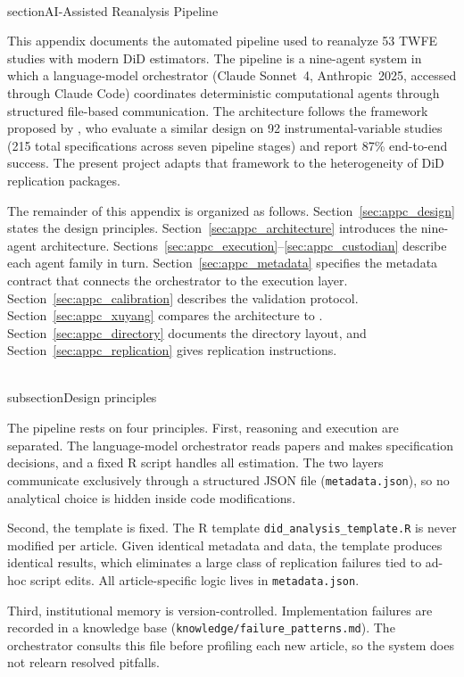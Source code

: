 \\section{AI-Assisted Reanalysis Pipeline}
\label{AppendixC}

This appendix documents the automated pipeline used to reanalyze 53 TWFE studies with modern DiD estimators. The pipeline is a nine-agent system in which a language-model orchestrator (Claude Sonnet~4, Anthropic~2025, accessed through Claude Code) coordinates deterministic computational agents through structured file-based communication. The architecture follows the framework proposed by \textcite{xu2026scaling}, who evaluate a similar design on 92 instrumental-variable studies (215 total specifications across seven pipeline stages) and report 87\% end-to-end success. The present project adapts that framework to the heterogeneity of DiD replication packages.

The remainder of this appendix is organized as follows. Section~\ref{sec:appc_design} states the design principles. Section~\ref{sec:appc_architecture} introduces the nine-agent architecture. Sections~\ref{sec:appc_execution}--\ref{sec:appc_custodian} describe each agent family in turn. Section~\ref{sec:appc_metadata} specifies the metadata contract that connects the orchestrator to the execution layer. Section~\ref{sec:appc_calibration} describes the validation protocol. Section~\ref{sec:appc_xuyang} compares the architecture to \textcite{xu2026scaling}. Section~\ref{sec:appc_directory} documents the directory layout, and Section~\ref{sec:appc_replication} gives replication instructions.


\\subsection{Design principles}
\label{sec:appc_design}

The pipeline rests on four principles. First, reasoning and execution are separated. The language-model orchestrator reads papers and makes specification decisions, and a fixed R script handles all estimation. The two layers communicate exclusively through a structured JSON file (\texttt{metadata.json}), so no analytical choice is hidden inside code modifications.

Second, the template is fixed. The R template \texttt{did\_analysis\_template.R} is never modified per article. Given identical metadata and data, the template produces identical results, which eliminates a large class of replication failures tied to ad-hoc script edits. All article-specific logic lives in \texttt{metadata.json}.

Third, institutional memory is version-controlled. Implementation failures are recorded in a knowledge base (\texttt{knowledge/failure\_patterns.md}). The orchestrator consults this file before profiling each new article, so the system does not relearn resolved pitfalls.

